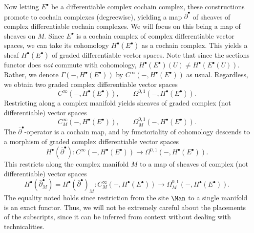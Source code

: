 \begin{discussion}
	Now letting $E^{\bullet} $ be a differentiable complex cochain complex, these constructions promote to cochain complexes (degreewise), yielding a map $\overline{\partial } ^{\bullet} $ of sheaves of complex differentiable cochain complexes. We will focus on this being a map of sheaves on $M$. Since $E^{\bullet} $ is a cochain complex of complex differentiable vector spaces, we can take its cohomology $H^{\bullet} (E^{\bullet} )$ as a cochain complex. This yields a sheaf $H^{\bullet} (E^{\bullet} )$ of graded differentiable vector spaces. Note that since the sections functor does \emph{not} commute with cohomology, $H^{\bullet} (E^{\bullet} )(U) \neq H^{\bullet} (E^{\bullet} (U))$. Rather, we denote $\Gamma (-,H^{\bullet} (E^{\bullet}))$ by $C^\infty(-,H^{\bullet} (E^{\bullet} )) $ as usual. Regardless, we obtain two graded complex differentiable vector spaces
	\[
		C^\infty(-,H^{\bullet} (E^{\bullet} )) ,\qquad \Omega ^{0,1} (-,H^{\bullet} (E^{\bullet} ))
	.\]
	Restricting along a complex manifold yields sheaves of graded complex (not differentiable) vector spaces
	\[
		C^\infty_{M}(-,H^{\bullet} (E^{\bullet} )) ,\qquad \Omega ^{0,1} _M(-,H^{\bullet} (E^{\bullet} ))
	.\]
	The $\overline{\partial }^{\bullet} $-operator is a cochain map, and by functoriality of cohomology descends to a morphism of graded complex differentiable vector spaces
	\[
		H^{\bullet} (\overline{\partial}^{\bullet}) : C^\infty(-,H^{\bullet} (E^{\bullet} ))  \to \Omega ^{0,1} (-,H^{\bullet} (E^{\bullet} ))
	.\]
	This restricts along the complex manifold $M$ to a map of sheaves of complex (not differentiable) vector spaces
	\[
		H^{\bullet} (\overline{\partial } ^{\bullet} _M) = H^{\bullet} (\overline{\partial } ^{\bullet} )_M : C^\infty_{M}(-,H^{\bullet} (E^{\bullet} ))  \to \Omega ^{0,1} _M(-,H^{\bullet} (E^{\bullet} ))
	.\]
	The equality noted holds since restriction from the site $\Man $ to a single manifold is an exact functor. Thus, we will not be extremely careful about the placements of the subscripts, since it can be inferred from context without dealing with technicalities.


\end{discussion}

